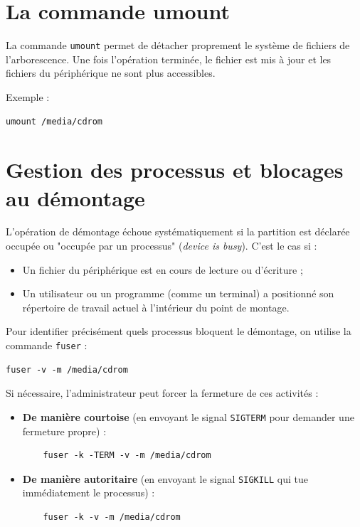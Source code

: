 \section{La commande umount}
La commande \texttt{umount} permet de détacher proprement le système de fichiers de l'arborescence. Une fois l'opération terminée, le fichier  est mis à jour et les fichiers du périphérique ne sont plus accessibles.

Exemple :
\begin{verbatim}
umount /media/cdrom
\end{verbatim}


\section{Gestion des processus et blocages au démontage}
L'opération de démontage échoue systématiquement si la partition est déclarée occupée ou "occupée par un processus" (\textit{device is busy}). C'est le cas si :
\begin{itemize}[label=$\bullet$]
    \item Un fichier du périphérique est en cours de lecture ou d'écriture ;
    \item Un utilisateur ou un programme (comme un terminal) a positionné son répertoire de travail actuel à l'intérieur du point de montage.
\end{itemize}

Pour identifier précisément quels processus bloquent le démontage, on utilise la commande \texttt{fuser} :
\begin{verbatim}
fuser -v -m /media/cdrom
\end{verbatim}

Si nécessaire, l'administrateur peut forcer la fermeture de ces activités :
\begin{itemize}[label=$\bullet$]
    \item \textbf{De manière courtoise} (en envoyant le signal \texttt{SIGTERM} pour demander une fermeture propre) :
    \begin{verbatim}
    fuser -k -TERM -v -m /media/cdrom
    \end{verbatim}
    \item \textbf{De manière autoritaire} (en envoyant le signal \texttt{SIGKILL} qui tue immédiatement le processus) :
    \begin{verbatim}
    fuser -k -v -m /media/cdrom
    \end{verbatim}
\end{itemize}